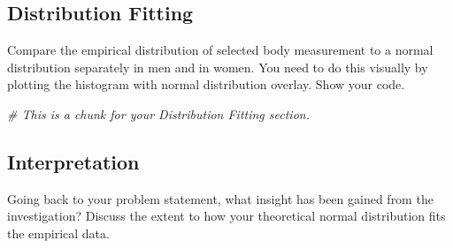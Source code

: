 \documentclass[]{article}
\newenvironment{Shaded}{\begin{snugshade}}{\end{snugshade}}
\newcommand{\CommentTok}[1]{\textcolor[rgb]{0.56,0.35,0.01}{\textit{#1}}}
\begin{document}
\hypertarget{distribution-fitting}{%
\subsection{Distribution Fitting}\label{distribution-fitting}}

Compare the empirical distribution of selected body measurement to a
normal distribution separately in men and in women. You need to do this
visually by plotting the histogram with normal distribution overlay.
Show your code.

\begin{Shaded}
\begin{Highlighting}[]
\CommentTok{# This is a chunk for your Distribution Fitting section. }
\end{Highlighting}
\end{Shaded}

\hypertarget{interpretation}{%
\subsection{Interpretation}\label{interpretation}}

Going back to your problem statement, what insight has been gained from
the investigation? Discuss the extent to how your theoretical normal
distribution fits the empirical data.
\end{document}
